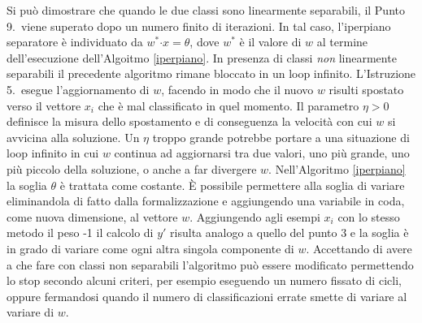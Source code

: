 \documentclass [11pt,a4paper,twoside,openright] {book}
\begin{document}
Si può dimostrare \cite{rosenblatt1958perceptron} che quando le due classi sono linearmente separabili, il Punto 9.\ viene superato dopo un numero finito di iterazioni. In tal caso, l'iperpiano separatore è individuato da $w^* \boldsymbol{ \cdot} x = \theta$, dove $w^*$ è il valore di $w$ al termine dell'esecuzione dell'Algoitmo \ref{iperpiano}. In presenza di classi \textit{non} linearmente separabili il precedente algoritmo rimane bloccato in un loop infinito.  L'Istruzione 5.\ esegue l'aggiornamento di $w$, facendo in modo che il nuovo $w$ risulti spostato verso il vettore $x_i$ che è mal classificato in quel momento. Il parametro $\eta > 0$ definisce la misura dello spostamento e di conseguenza la velocità con cui $w$ si avvicina alla soluzione. Un $\eta$ troppo grande potrebbe portare a una situazione di loop infinito in cui $w$ continua ad aggiornarsi tra due valori, uno più grande, uno più piccolo della soluzione, o anche a far divergere $w$. Nell'Algoritmo \ref{iperpiano} la soglia $\theta$ è trattata come costante. È possibile permettere alla soglia di variare eliminandola di fatto dalla formalizzazione e aggiungendo una variabile in coda, come nuova dimensione, al vettore $w$. Aggiungendo agli esempi $x_i$ con lo stesso metodo il peso -1 il calcolo di $y'$ risulta analogo a quello del punto 3 e la soglia è in grado di variare come ogni altra singola componente di $w$. Accettando di avere a che fare con classi non separabili l'algoritmo può essere modificato permettendo lo stop secondo alcuni criteri, per esempio eseguendo un numero fissato di cicli, oppure fermandosi quando il numero di classificazioni errate smette di variare al variare di $w$.
\end{document}
